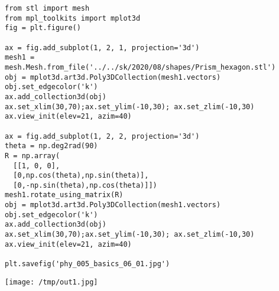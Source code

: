 \documentclass[12pt,fleqn]{article}\usepackage{../../common}
\begin{document}
\begin{verbatim}
from stl import mesh
from mpl_toolkits import mplot3d
fig = plt.figure()

ax = fig.add_subplot(1, 2, 1, projection='3d')
mesh1 = mesh.Mesh.from_file('../../sk/2020/08/shapes/Prism_hexagon.stl')
obj = mplot3d.art3d.Poly3DCollection(mesh1.vectors)
obj.set_edgecolor('k')
ax.add_collection3d(obj)
ax.set_xlim(30,70);ax.set_ylim(-10,30); ax.set_zlim(-10,30)
ax.view_init(elev=21, azim=40)

ax = fig.add_subplot(1, 2, 2, projection='3d')
theta = np.deg2rad(90)
R = np.array(
  [[1, 0, 0],
  [0,np.cos(theta),np.sin(theta)],
  [0,-np.sin(theta),np.cos(theta)]])
mesh1.rotate_using_matrix(R)
obj = mplot3d.art3d.Poly3DCollection(mesh1.vectors)
obj.set_edgecolor('k')
ax.add_collection3d(obj)
ax.set_xlim(30,70);ax.set_ylim(-10,30); ax.set_zlim(-10,30)
ax.view_init(elev=21, azim=40)

plt.savefig('phy_005_basics_06_01.jpg')
\end{verbatim}

\texttt{[image: /tmp/out1.jpg]}
\end{document}
